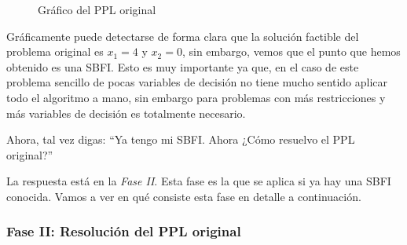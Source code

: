 \begin{figure}[ht]
  \centering
  \caption{Gráfico del PPL original}
  \label{fig:ppl_simplex_grafico}
\end{figure}
Gráficamente puede detectarse de forma clara que la solución factible del problema original es \(x_1=4\) y \(x_2=0\), sin embargo, vemos que el punto que hemos obtenido es una SBFI. Esto es muy importante ya que, en el caso de este problema sencillo de pocas variables de decisión no tiene mucho sentido aplicar todo el algoritmo a mano, sin embargo para problemas con más restricciones y más variables de decisión es totalmente necesario.

Ahora, tal vez digas: ``Ya tengo mi SBFI. Ahora ¿Cómo resuelvo el PPL original?''

La respuesta está en la \textit{Fase II}. Esta fase es la que se aplica si ya hay una SBFI conocida. Vamos a ver en qué consiste esta fase en detalle a continuación.

\subsubsection{Fase II: Resolución del PPL original}

